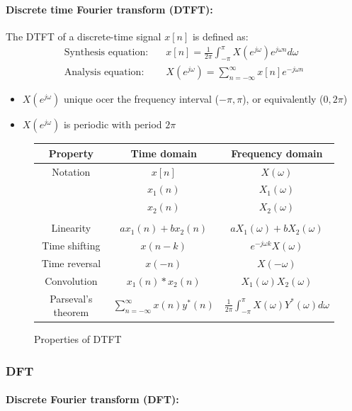 \documentclass{article}
\begin{document}
\paragraph{Discrete time Fourier transform (DTFT):} The DTFT of a discrete-time signal $x[n]$ is defined as:
\begin{align}
    \text{Synthesis equation:} \quad & x[n] = \frac{1}{2\pi} \int_{-\pi}^{\pi} X(e^{j\omega})e^{j\omega n} d\omega \\
    \text{Analysis equation:} \quad & X(e^{j\omega}) = \sum_{n=-\infty}^{\infty} x[n]e^{-j\omega n}
\end{align}
\begin{itemize}
    \item $X(e^{j\omega})$ unique ocer the frequency interval ($-\pi,\pi$), or equivalently ($0,2\pi$)
    \item $X(e^{j\omega})$ is periodic with period $2\pi$
\end{itemize}

\begin{figure}[h!]
    \centering
    \begin{tabular}{|c c c|}
        \hline
        Property & Time domain & Frequency domain \\
        \hline
        Notation & $x[n]$ & $X(\omega)$ \\
        & $x_1(n)$ & $X_1(\omega)$ \\
        & $x_2(n)$ & $X_2(\omega)$ \\
        \\
        Linearity & $ax_1(n) + bx_2(n)$ & $aX_1(\omega) + bX_2(\omega)$ \\
        Time shifting & $x(n-k)$ & $e^{-j\omega k}X(\omega)$ \\
        Time reversal & $x(-n)$ & $X(-\omega)$ \\
        Convolution & $x_1(n) \ast x_2(n)$ & $X_1(\omega)X_2(\omega)$ \\
        Parseval's theorem & $\sum_{n=-\infty}^{\infty}x(n)y^*(n)$ & $\frac{1}{2\pi}\int_{-\pi}^{\pi}X(\omega)Y^*(\omega)d\omega$ \\
        \hline
    \end{tabular}
    \caption{Properties of DTFT}
    \label{table:DTFT_properties}
\end{figure}

\subsubsection{DFT}
\paragraph{Discrete Fourier transform (DFT):} 
\end{document}
